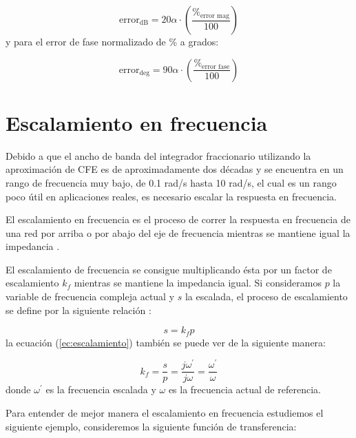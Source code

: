 	\begin{equation}
		\mathrm{error}_{\mathrm{dB}} =  20 \alpha \cdot \left( \frac{\%_{\mathrm{error\,\,mag}}}{100} \right)
	\end{equation}
	y para el error de fase normalizado de \% a grados:
	
	\begin{equation}
		\mathrm{error}_{\mathrm{deg}} = 90 \alpha \cdot \left( \frac{\%_{\mathrm{error\,\,fase}}}{100} \right) 
	\end{equation}
	                                                                 
	\section{Escalamiento en frecuencia}
	
	Debido a que el ancho de banda del integrador fraccionario utilizando la aproximación de CFE es de aproximadamente dos décadas y se encuentra en un rango de frecuencia muy bajo, de 0.1 rad/s hasta 10 rad/s, el cual es un rango poco útil en aplicaciones reales, es necesario escalar la respuesta en frecuencia.
	
	El escalamiento en frecuencia es el proceso de correr la respuesta en frecuencia de una red por arriba o por abajo del eje de frecuencia mientras  se mantiene igual la impedancia \cite{CharlesAlexander2016}.
	
	El escalamiento de frecuencia se consigue multiplicando ésta por un factor de escalamiento $k_{f}$ mientras se mantiene la impedancia igual. Si consideramos $p$ la variable de frecuencia compleja actual y $s$ la escalada, el proceso de escalamiento se define por la siguiente relación \cite{Allen1980}:
	
	\begin{equation}
		s = k_{f} p
		\label{ec:escalamiento}
	\end{equation}
	la ecuación (\ref{ec:escalamiento}) también se puede ver de la siguiente manera:
	
	\begin{equation}
		k_{f} = \frac{s}{p} = \frac{j \omega^{'}}{j \omega} = \frac{\omega^{'}}{\omega}
	\end{equation}
	donde $\omega^{'}$ es la frecuencia escalada y $\omega$ es la frecuencia actual de referencia.
	
	Para entender de mejor manera el escalamiento en frecuencia estudiemos el siguiente ejemplo, consideremos la siguiente función de transferencia:
	
